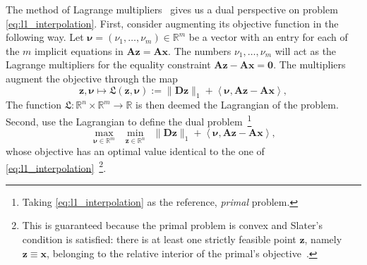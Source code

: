 The method of Lagrange multipliers~\cite[Ch. 5]{boyd2009} gives us a dual perspective on problem \eqref{eq:l1_interpolation}. First, consider augmenting its objective function in the following way. Let $\bm{\nu} = (\nu_1, \dots, \nu_m) \in \mathbb{R}^{m}$ be a vector with an entry for each of the $m$ implicit equations in $\mathbf{Az} = \mathbf{Ax}$. The numbers $\nu_1, \dots, \nu_m$ will act as the Lagrange multipliers for the equality constraint $\mathbf{Az} - \mathbf{Ax} = \mathbf{0}$. The multipliers augment the objective through the map
\begin{equation}
    \mathbf{z}, \bm{\nu} \mapsto \mathfrak{L}(\mathbf{z}, \bm{\nu}) := \| \mathbf{D z} \|_1 + \left\langle \bm{\nu}, \mathbf{Az} - \mathbf{Ax}\right\rangle,
\end{equation}
The function $\mathfrak{L}: \mathbb{R}^{n} \times \mathbb{R}^{m} \to \mathbb{R}$ is then deemed the Lagrangian of the problem. Second, use the Lagrangian to define the dual problem~\footnote{Taking \eqref{eq:l1_interpolation} as the reference, \emph{primal} problem.}
\begin{equation}
    \underset{\bm{\nu} \in \mathbb{R}^{m}}{\max} \enspace \underset{\mathbf{z} \in \mathbb{R}^{n}}{\min} \enspace \| \mathbf{D z} \|_1 + \left\langle \bm{\nu}, \mathbf{Az} - \mathbf{Ax}\right\rangle \tag{P1-dual},
    \label{eq:l1_interpolation_dual}
\end{equation}
whose objective has an optimal value identical to the one of \eqref{eq:l1_interpolation}~\footnote{This is guaranteed because the primal problem is convex and Slater's condition is satisfied: there is at least one strictly feasible point $\mathbf{z}$, namely $\mathbf{z} \equiv \mathbf{x}$, belonging to the relative interior of the primal's objective~\cite[Sec. 5.2.3]{boyd2009}.}.

